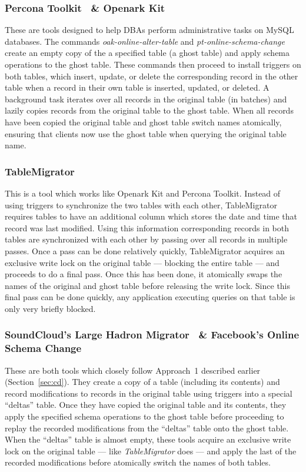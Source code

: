 \documentclass[conference]{IEEEtran}
\begin{document}
\subsubsection{Percona Toolkit~\cite{PerconaToolkit} \& Openark Kit~\cite{OpenarkKit}}
These are tools designed to help DBAs perform administrative tasks on MySQL databases. The commands \textit{oak-online-alter-table} and \textit{pt-online-schema-change} create an empty copy of the a specified table (a ghost table) and apply schema operations to the ghost table. These commands then proceed to install triggers on both tables, which insert, update, or delete the corresponding record in the other table when a record in their own table is inserted, updated, or deleted. A background task iterates over all records in the original table (in batches) and lazily copies records from the original table to the ghost table. When all records have been copied the original table and ghost table switch names atomically, ensuring that clients now use the ghost table when querying the original table name.

\subsubsection{TableMigrator~\cite{TableMigrator}}
This is a tool which works like Openark Kit and Percona Toolkit. Instead of using triggers to synchronize the two tables with each other,  TableMigrator requires tables to have an additional column which stores the date and time that record was last modified. Using this information corresponding records in both tables are synchronized with each other by passing over all records in multiple passes. Once a pass can be done relatively quickly, TableMigrator acquires an exclusive write lock on the original table --- blocking the entire table --- and proceeds to do a final pass. Once this has been done, it atomically swaps the names of the original and ghost table before releasing the write lock. Since this final pass can be done quickly, any application executing queries on that table is only very briefly blocked.

\subsubsection{SoundCloud's Large Hadron Migrator~\cite{SoundcloudLHM} \& Facebook's Online Schema Change~\cite{FacebookOSC}}
These are both tools which closely follow Approach~1 described earlier (Section~\ref{sec:cd}). They create a copy of a table (including its contents) and record modifications to records in the original table using triggers into a special ``deltas'' table. Once they have copied the original table and its contents, they apply the specified schema operations to the ghost table before proceeding to replay the recorded modifications from the ``deltas'' table onto the ghost table. When the ``deltas'' table is almost empty, these tools acquire an exclusive write lock on the original table --- like \textit{TableMigrator} does --- and apply the last of the recorded modifications before atomically switch the names of both tables.
\end{document}
